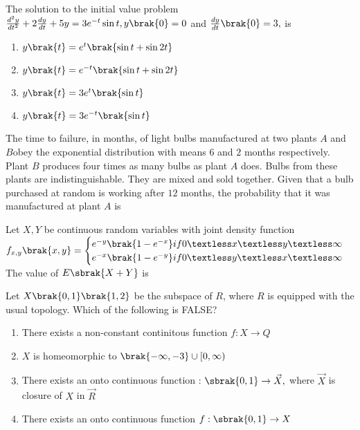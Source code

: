     \item The solution to the initial value problem $\frac{d^2y}{dt^2}+2\frac{dy}{dt}+5y=3e^{-t}\sin{t},y\brak{0}=0$ and $\frac{dy}{dt}\brak{0}=3,$ is
    \begin{enumerate}
        \item $y\brak{t}=e^{t}\brak{\sin{t}+\sin{2t}}$
        \item $y\brak{t}=e^{-t}\brak{\sin{t}+\sin{2t}}$
        \item $y\brak{t}=3e^{t}\brak{\sin{t}}$
        \item $y\brak{t}=3e^{-t}\brak{\sin{t}}$ \\
    \end{enumerate}
    \item The time to failure, in months, of light bulbs manufactured at two plants $A$ and $B $obey the exponential distribution with means $6$ and $2$ months respectively. Plant $B$ produces four times as many bulbs as plant $A$ does. Bulbs from these plants are indistinguishable. They are mixed and sold together. Given that a bulb purchased at random is working after $12$ months, the probability that it was manufactured at plant $A$ is\\
    \item Let $X,Y$ be continuous random variables with joint density function\\
    $f_{x,y}\brak{x,y}=\begin{cases}
        e^{-y}\brak{1-e^{-x}}  if  0\textless x\textless y \textless\infty\\ e^{-x}\brak{1-e^{-y}}  if  0\textless y\textless x \textless\infty
    \end{cases}$\\
    The value of  $E\sbrak{X+Y}$ is \\
    \item Let $X\brak{0,1} \brak{1,2}$ be the subspace of $R$, where $R$ is equipped with the usual topology. Which of the following is FALSE?
    \begin{enumerate}
        \item There exists a non-constant continitous function $f:X\rightarrow Q$
        \item  $X$ is homeomorphic to $\brak{-\infty,-3}\cup[ 0,\infty ) $ 
        \item There exists an onto continuous function : $\sbrak{0,1}\rightarrow \vec{X},$ where $\Vec{X}$ is closure of $X$ in $\vec{R}$
        \item There exists an onto continuous function $f:\sbrak{0,1}\rightarrow X$\\
    \end{enumerate}

